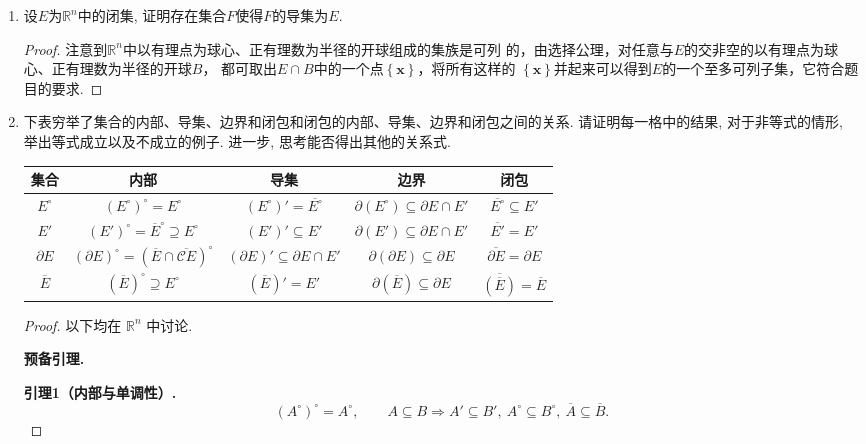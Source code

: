 \begin{3b}
\begin{enumerate}
\item 设\(E\)为\(\mathbb{R}^n\)中的闭集, 证明存在集合\(F\)使得\(F\)的导集为\(E\).
\begin{proof}
注意到$\mathbb{R}^n$中以有理点为球心、正有理数为半径的开球组成的集族是可列
的，由选择公理，对任意与$E$的交非空的以有理点为球心、正有理数为半径的开球$B$，
都可取出$E\cap B$中的⼀个点$\left\{\boldsymbol{x}\right\}$，将所有这样的
$\left\{\boldsymbol{x}\right\}$并起来可以得到$E$的⼀个至多可列子集，它符合题目的要求.
\end{proof}


\item 下表穷举了集合的内部、导集、边界和闭包和闭包的内部、导集、边界和闭包之间的关系. 
请证明每一格中的结果, 对于非等式的情形, 举出等式成立以及不成立的例子. 进一步, 思考能否得出其他的关系式.
    \begin{table}
      \begin{tabular}{ccccc}
        \hline
        集合  &  内部  &  导集  &  边界  &  闭包\\\hline
        \(E^\circ\)  &  \((E^\circ)^\circ=E^\circ\)  &  \((E^\circ)'=\overline{E^\circ}\)  &  \(\partial(E^\circ)\subseteq\partial E\cap E'\)  &  \(\overline{E^\circ}\subseteq E'\)\\
        \(E'\)  &  \((E')^\circ=\overline{E}^\circ\supseteq E^\circ\)  &  \((E')'\subseteq E'\)  &  \(\partial (E')\subseteq \partial E\cap E'\)  &  \(\overline{E'}=E'\)\\
        \(\partial E\)  &  \((\partial E)^\circ=(\overline{E}\cap \overline{\mathscr{C}E})^\circ\)  &  \((\partial E)'\subseteq\partial E\cap E'\)  &  \(\partial(\partial E)\subseteq \partial E\)  &  \(\overline{\partial E}=\partial E\)\\
        \(\overline{E}\)  &  \((\overline{E})^\circ\supseteq E^\circ\)  &  \((\overline{E})'=E'\)  &  \(\partial(\overline{E})\subseteq \partial E\)  &  \(\overline{\left(\overline{E}\right)}=\overline{E}\)
      \end{tabular}
    \end{table}
\begin{proof}
    以下均在 $\mathbb{R}^n$ 中讨论.

\textbf{预备引理.}

\textbf{引理1（内部与单调性）.}
\[
(A^\circ)^\circ=A^\circ,
\qquad
A\subseteq B\Longrightarrow A'\subseteq B',\ A^\circ\subseteq B^\circ,\ \overline{A}\subseteq \overline{B}.
\]


\end{proof}
\end{enumerate}
\end{3b}
